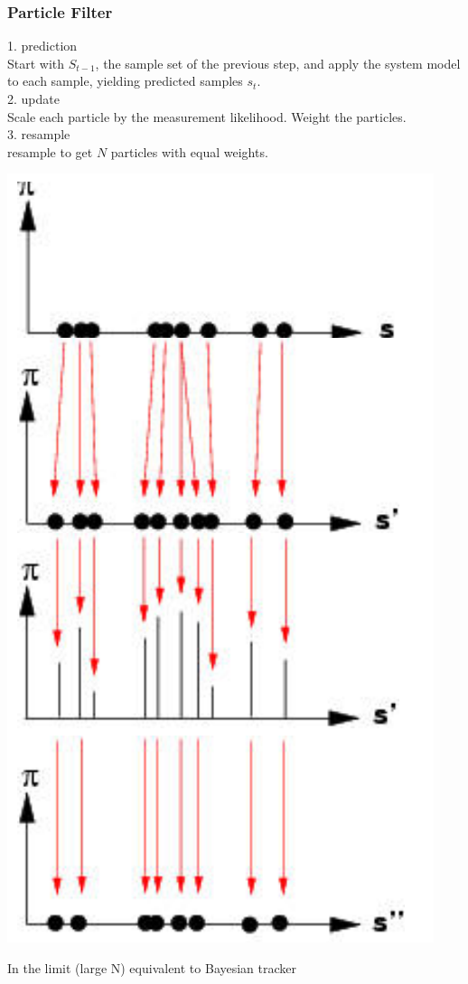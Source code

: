\subsubsection{Particle Filter}
\begin{multicols}{2}
	1. prediction\\
	Start with $S_{t-1}$, the sample set of the previous step, and apply the system model to each sample, yielding predicted samples $s_t$.\\
	2. update\\
	Scale each particle by the measurement likelihood. Weight the particles.\\
	3. resample\\
	resample to get $N$ particles with equal weights.
	
	\columnbreak
	\includegraphics[width=0.7\columnwidth]{pictures/particlefilter}
\end{multicols}

In the limit (large N) equivalent to Bayesian tracker

